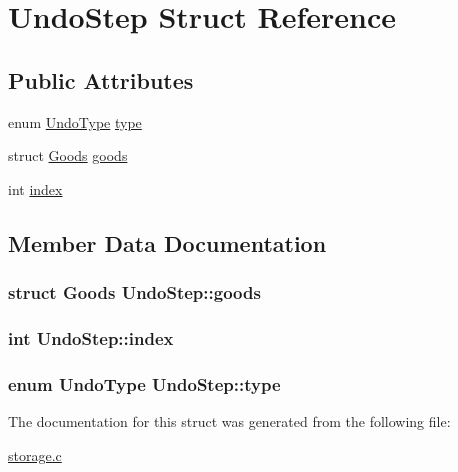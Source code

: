 \hypertarget{structUndoStep}{\section{Undo\-Step Struct Reference}
\label{structUndoStep}
}
\subsection*{Public Attributes}
\begin{DoxyCompactItemize}
\item 
enum \hyperlink{storage_8c_a59aa5ac2a3f0eb17da5896ec0d5f4975}{Undo\-Type} \hyperlink{structUndoStep_ae2b16ab8e3229bfb6da5270190a59638}{type}
\item 
struct \hyperlink{structGoods}{Goods} \hyperlink{structUndoStep_ace65b8ae30a0cb547c5ee0a45fbdd041}{goods}
\item 
int \hyperlink{structUndoStep_afce8826c9850bc0cf946f2c2b4a75ede}{index}
\end{DoxyCompactItemize}


\subsection{Member Data Documentation}
\hypertarget{structUndoStep_ace65b8ae30a0cb547c5ee0a45fbdd041}{
\subsubsection[{goods}]{\setlength{\rightskip}{0pt plus 5cm}struct {\bf Goods} Undo\-Step\-::goods}}\label{structUndoStep_ace65b8ae30a0cb547c5ee0a45fbdd041}
\hypertarget{structUndoStep_afce8826c9850bc0cf946f2c2b4a75ede}{
\subsubsection[{index}]{\setlength{\rightskip}{0pt plus 5cm}int Undo\-Step\-::index}}\label{structUndoStep_afce8826c9850bc0cf946f2c2b4a75ede}
\hypertarget{structUndoStep_ae2b16ab8e3229bfb6da5270190a59638}{
\subsubsection[{type}]{\setlength{\rightskip}{0pt plus 5cm}enum {\bf Undo\-Type} Undo\-Step\-::type}}\label{structUndoStep_ae2b16ab8e3229bfb6da5270190a59638}


The documentation for this struct was generated from the following file\-:\begin{DoxyCompactItemize}
\item 
\hyperlink{storage_8c}{storage.\-c}\end{DoxyCompactItemize}

